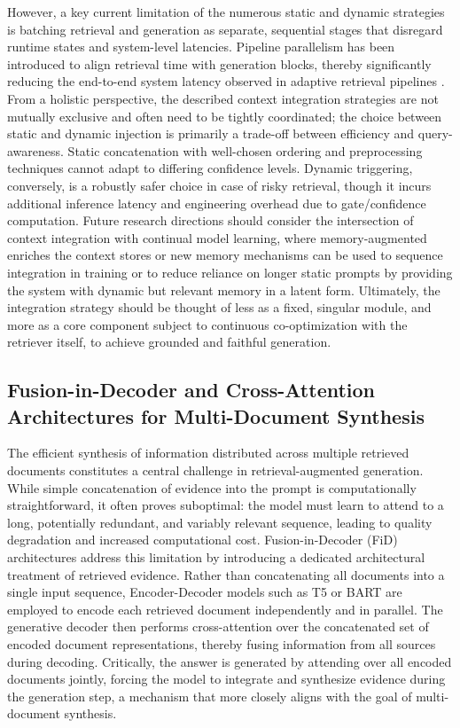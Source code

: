 \documentclass[11pt,a4paper]{article}
\begin{document}
However, a key current limitation of the numerous static and dynamic strategies is batching retrieval and generation as separate, sequential stages that disregard runtime states and system-level latencies. Pipeline parallelism has been introduced to align retrieval time with generation blocks, thereby significantly reducing the end-to-end system latency observed in adaptive retrieval pipelines \cite{arxiv:2403.05676v1}. From a holistic perspective, the described context integration strategies are not mutually exclusive and often need to be tightly coordinated; the choice between static and dynamic injection is primarily a trade-off between efficiency and query-awareness. Static concatenation with well-chosen ordering and preprocessing techniques cannot adapt to differing confidence levels. Dynamic triggering, conversely, is a robustly safer choice in case of risky retrieval, though it incurs additional inference latency and engineering overhead due to gate/confidence computation. Future research directions should consider the intersection of context integration with continual model learning, where memory-augmented enriches the context stores \cite{arxiv:1612.04426v1} or new memory mechanisms \cite{arxiv:2403.04317v1,arxiv:2402.04624v1} can be used to sequence integration in training or to reduce reliance on longer static prompts by providing the system with dynamic but relevant memory in a latent form. Ultimately, the integration strategy should be thought of less as a fixed, singular module, and more as a core component subject to continuous co-optimization with the retriever itself, to achieve grounded and faithful generation.


\subsection{Fusion-in-Decoder and Cross-Attention Architectures for Multi-Document Synthesis}


The efficient synthesis of information distributed across multiple retrieved documents constitutes a central challenge in retrieval-augmented generation. While simple concatenation of evidence into the prompt is computationally straightforward, it often proves suboptimal: the model must learn to attend to a long, potentially redundant, and variably relevant sequence, leading to quality degradation and increased computational cost. Fusion-in-Decoder (FiD) architectures address this limitation by introducing a dedicated architectural treatment of retrieved evidence. Rather than concatenating all documents into a single input sequence, Encoder-Decoder models such as T5 or BART are employed to encode each retrieved document independently and in parallel. The generative decoder then performs cross-attention over the concatenated set of encoded document representations, thereby fusing information from all sources during decoding. Critically, the answer is generated by attending over all encoded documents jointly, forcing the model to integrate and synthesize evidence during the generation step, a mechanism that more closely aligns with the goal of multi-document synthesis.
\end{document}
